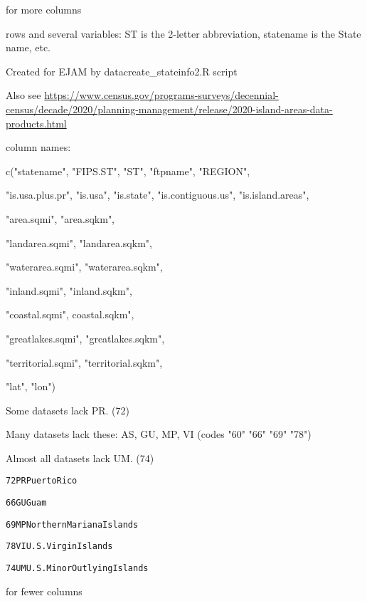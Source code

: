 \documentclass[a4paper]{book}
\begin{document}
%
\begin{SeeAlso}\relax
{} for more columns
\end{SeeAlso}
%
\begin{Description} rows and several variables: ST is the 2-letter abbreviation,
statename is the State name, etc.
\end{Description}
%
\begin{Details}\relax
Created for EJAM by datacreate\_stateinfo2.R script

Also see \url{https://www.census.gov/programs-surveys/decennial-census/decade/2020/planning-management/release/2020-island-areas-data-products.html}

column names:

c("statename", "FIPS.ST", "ST", "ftpname", "REGION",

"is.usa.plus.pr", "is.usa", "is.state", "is.contiguous.us", "is.island.areas",

"area.sqmi", "area.sqkm",

"landarea.sqmi", "landarea.sqkm",

"waterarea.sqmi", "waterarea.sqkm",

"inland.sqmi", "inland.sqkm",

"coastal.sqmi", coastal.sqkm",

"greatlakes.sqmi", "greatlakes.sqkm",

"territorial.sqmi", "territorial.sqkm",

"lat", "lon")

Some datasets lack PR. (72)

Many datasets lack these:  AS, GU, MP, VI (codes "60" "66" "69" "78")

Almost all datasets lack UM. (74)

\begin{alltt}    72 PR                 Puerto Rico
    
    66 GU                        Guam 
    
    69 MP    Northern Mariana Islands  
    
    78 VI         U.S. Virgin Islands 
    
    74 UM U.S. Minor Outlying Islands  
\end{alltt}

\end{Details}
%
\begin{SeeAlso}\relax
{}  for fewer columns
\end{SeeAlso}
\end{document}
